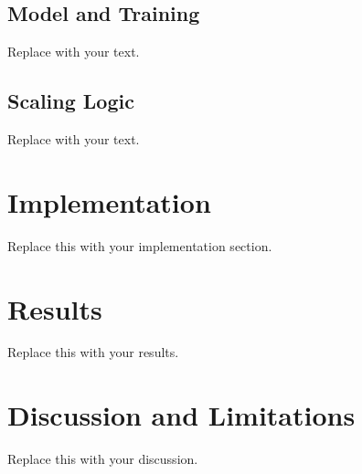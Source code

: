 \documentclass[conference]{IEEEtran}
\begin{document}
\subsection{Model and Training}
Replace with your text.

\subsection{Scaling Logic}
Replace with your text.

\section{Implementation}
\label{sec:implementation}
Replace this with your implementation section.

\section{Results}
\label{sec:results}
Replace this with your results.

\section{Discussion and Limitations}
\label{sec:discussion}
Replace this with your discussion.
\end{document}
